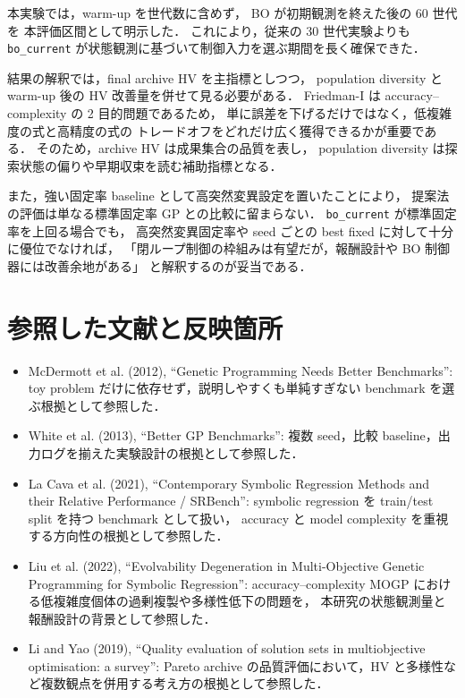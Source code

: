 \documentclass[a4paper,11pt]{ltjsarticle}
\newcommand{\HV}{\mathrm{HV}}
\begin{document}
本実験では，warm-up を世代数に含めず，
BO が初期観測を終えた後の 60 世代を
本評価区間として明示した．
これにより，従来の 30 世代実験よりも
\texttt{bo\_current} が状態観測に基づいて制御入力を選ぶ期間を長く確保できた．

結果の解釈では，final archive \(\HV\) を主指標としつつ，
population diversity と warm-up 後の \(\HV\) 改善量を併せて見る必要がある．
Friedman-I は accuracy--complexity の 2 目的問題であるため，
単に誤差を下げるだけではなく，低複雑度の式と高精度の式の
トレードオフをどれだけ広く獲得できるかが重要である．
そのため，archive \(\HV\) は成果集合の品質を表し，
population diversity は探索状態の偏りや早期収束を読む補助指標となる．

また，強い固定率 baseline として高突然変異設定を置いたことにより，
提案法の評価は単なる標準固定率 GP との比較に留まらない．
\texttt{bo\_current} が標準固定率を上回る場合でも，
高突然変異固定率や seed ごとの best fixed に対して十分に優位でなければ，
「閉ループ制御の枠組みは有望だが，報酬設計や BO 制御器には改善余地がある」
と解釈するのが妥当である．

\section{参照した文献と反映箇所}

\begin{itemize}
  \item McDermott et al. (2012), ``Genetic Programming Needs Better Benchmarks'':
  toy problem だけに依存せず，説明しやすくも単純すぎない benchmark を選ぶ根拠として参照した．
  \item White et al. (2013), ``Better GP Benchmarks'':
  複数 seed，比較 baseline，出力ログを揃えた実験設計の根拠として参照した．
  \item La Cava et al. (2021), ``Contemporary Symbolic Regression Methods and their Relative Performance / SRBench'':
  symbolic regression を train/test split を持つ benchmark として扱い，
  accuracy と model complexity を重視する方向性の根拠として参照した．
  \item Liu et al. (2022), ``Evolvability Degeneration in Multi-Objective Genetic Programming for Symbolic Regression'':
  accuracy--complexity MOGP における低複雑度個体の過剰複製や多様性低下の問題を，
  本研究の状態観測量と報酬設計の背景として参照した．
  \item Li and Yao (2019), ``Quality evaluation of solution sets in multiobjective optimisation: a survey'':
  Pareto archive の品質評価において，HV と多様性など複数観点を併用する考え方の根拠として参照した．
\end{itemize}
\end{document}
